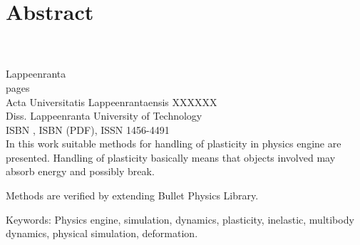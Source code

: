 \section*{Abstract}

\textbf{\myname}\\
\textbf{\mytitle}\\
Lappeenranta \myyear\\
\pageref{LastPage} pages\\
Acta Universitatis Lappeenrantaensis XXXXXX\\
Diss. Lappeenranta University of Technology\\
ISBN \myisbn, ISBN \mypdfisbn (PDF), ISSN 1456-4491\\

In this work suitable methods for handling of plasticity in physics engine are presented.
Handling of plasticity basically means that objects involved may absorb energy and possibly break.

Methods are verified by extending Bullet Physics Library. 

Keywords: Physics engine, simulation, dynamics, plasticity, inelastic, multibody dynamics,  physical simulation, deformation.

